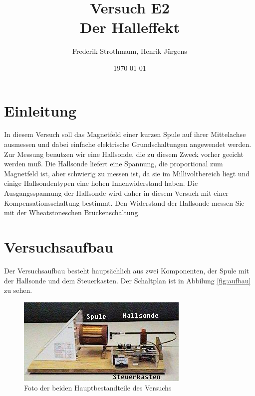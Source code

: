 \documentclass[12pt]{scrartcl}
\title{Versuch E2\\ Der Halleffekt}
\author{Frederik Strothmann, Henrik Jürgens}
\date{\today}
\begin{document}

\maketitle
\tableofcontents
\newpage


\section{Einleitung}

In diesem Versuch soll das Magnetfeld einer kurzen Spule auf ihrer Mittelachse ausmessen und dabei einfache elektrische Grundschaltungen angewendet werden. Zur Messung benutzen wir eine Hallsonde, die zu diesem Zweck vorher geeicht werden muß. Die Hallsonde liefert eine Spannung, die proportional zum Magnetfeld ist, aber schwierig zu messen ist, da sie im Millivoltbereich liegt und einige Hallsondentypen eine hohen Innenwiderstand haben. Die Ausgangsspannung der Hallsonde wird daher in diesem Versuch mit einer Kompensationsschaltung bestimmt. Den Widerstand der Hallsonde messen Sie mit der
Wheatstoneschen Brückenschaltung.


\section{Versuchsaufbau}
Der Versuchsaufbau besteht haupsächlich aus zwei Komponenten, der Spule mit der Hallsonde und dem Steuerkasten.
Der Schaltplan ist in Abbilung \ref{fig:aufbau} zu sehen.

\begin{figure}[htbp] 
  \centering
    \includegraphics[scale = 0.5]{kasten_und_spule.JPG}
  	\caption[Foto der beiden Hauptbestandteile des Versuchs]{Foto der beiden Hauptbestandteile des Versuchs\footnotemark}
  \label{fig:kasten_und_spule}
\end{figure}
\end{document}
